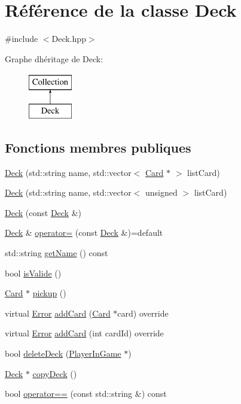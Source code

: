 \hypertarget{classDeck}{}\section{Référence de la classe Deck}
\label{classDeck}


{\ttfamily \#include $<$Deck.\+hpp$>$}

Graphe d\textquotesingle{}héritage de Deck\+:\begin{figure}[H]
\begin{center}
\leavevmode
\includegraphics[height=2.000000cm]{classDeck}
\end{center}
\end{figure}
\subsection*{Fonctions membres publiques}
\begin{DoxyCompactItemize}
\item 
\hyperlink{classDeck_ab7f2fc685f721ab93884d04826db1de0}{Deck} (std\+::string name, std\+::vector$<$ \hyperlink{classCard}{Card} $\ast$ $>$ list\+Card)
\item 
\hyperlink{classDeck_a34d860bcef590d58850606102623da07}{Deck} (std\+::string name, std\+::vector$<$ unsigned $>$ list\+Card)
\item 
\hyperlink{classDeck_a11233381fd5ea0b0b4e6288048f146fa}{Deck} (const \hyperlink{classDeck}{Deck} \&)
\item 
\hyperlink{classDeck}{Deck} \& \hyperlink{classDeck_ac3d2eaa856438ec34f898821e7e76a6d}{operator=} (const \hyperlink{classDeck}{Deck} \&)=default
\item 
std\+::string \hyperlink{classDeck_aa140e47d3e2fbb1de45b153a2fce8375}{get\+Name} () const 
\item 
bool \hyperlink{classDeck_a66cfb2d1adfb6b0b94ed25c8f5ca29f9}{is\+Valide} ()
\item 
\hyperlink{classCard}{Card} $\ast$ \hyperlink{classDeck_a910d3c6c7a83168fd7f2485778d5bfe0}{pickup} ()
\item 
virtual \hyperlink{Error_8hpp_a2c3e4bb40f36b262a5214e2da2bca9c5}{Error} \hyperlink{classDeck_a741aa3330dc4912beb69c962e74df507}{add\+Card} (\hyperlink{classCard}{Card} $\ast$card) override
\item 
virtual \hyperlink{Error_8hpp_a2c3e4bb40f36b262a5214e2da2bca9c5}{Error} \hyperlink{classDeck_a5c18872420a1969dba61ee3eca320aa7}{add\+Card} (int card\+Id) override
\item 
bool \hyperlink{classDeck_a360cf67965cd28b8bdda3ec932ae3296}{delete\+Deck} (\hyperlink{classPlayerInGame}{Player\+In\+Game} $\ast$)
\item 
\hyperlink{classDeck}{Deck} $\ast$ \hyperlink{classDeck_ab216a347587d7afe42adecb58a42fcbb}{copy\+Deck} ()
\item 
bool \hyperlink{classDeck_a52acbf278ff10f88a9438906afad6f3a}{operator==} (const std\+::string \&) const 
\end{DoxyCompactItemize}
